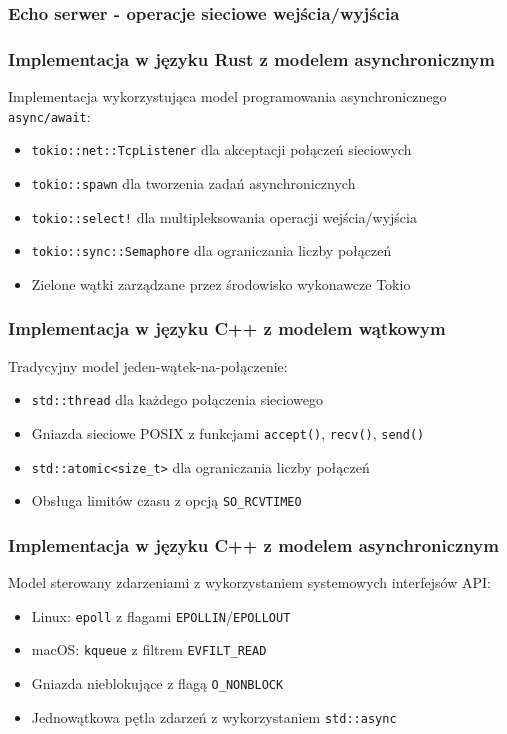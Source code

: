 \subsubsection{Echo serwer - operacje sieciowe wejścia/wyjścia}

\subsubsection{Implementacja w języku Rust z modelem asynchronicznym}
Implementacja wykorzystująca model programowania asynchronicznego \texttt{async/await}:
\begin{itemize}
    \item \texttt{tokio::net::TcpListener} dla akceptacji połączeń sieciowych
    \item \texttt{tokio::spawn} dla tworzenia zadań asynchronicznych
    \item \texttt{tokio::select!} dla multipleksowania operacji wejścia/wyjścia
    \item \texttt{tokio::sync::Semaphore} dla ograniczania liczby połączeń
    \item Zielone wątki  zarządzane przez środowisko wykonawcze Tokio
\end{itemize}

\subsubsection{Implementacja w języku C++ z modelem wątkowym}
Tradycyjny model jeden-wątek-na-połączenie:
\begin{itemize}
    \item \texttt{std::thread} dla każdego połączenia sieciowego
    \item Gniazda sieciowe POSIX z funkcjami \texttt{accept()}, \texttt{recv()}, \texttt{send()}
    \item \texttt{std::atomic<size\_t>} dla ograniczania liczby połączeń
    \item Obsługa limitów czasu z opcją \texttt{SO\_RCVTIMEO}
\end{itemize}

\subsubsection{Implementacja w języku C++ z modelem asynchronicznym}
Model sterowany zdarzeniami z wykorzystaniem systemowych interfejsów API:
\begin{itemize}
    \item Linux: \texttt{epoll} z flagami \texttt{EPOLLIN}/\texttt{EPOLLOUT}
    \item macOS: \texttt{kqueue} z filtrem \texttt{EVFILT\_READ}
    \item Gniazda nieblokujące z flagą \texttt{O\_NONBLOCK}
    \item Jednowątkowa pętla zdarzeń z wykorzystaniem \texttt{std::async}
\end{itemize}

